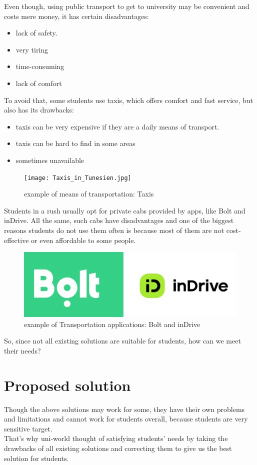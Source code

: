 Even though, using public transport to get to university may be convenient and costs mere money, it has certain disadvantages:
\begin{itemize}
    \item lack of safety.
    \item very tiring
    \item time-consuming
    \item lack of comfort
\end{itemize}
To avoid that, some students use taxis, which offers comfort and fast service, but also has its drawbacks: 
\begin{itemize}
    \item taxis can be very expensive if they are a daily means of transport.
    \item taxis can be hard to find in some areas
    \item sometimes unavailable
\end{itemize}
\begin{figure}[H] 
            \centering
            \texttt{[image: Taxis\_in\_Tunesien.jpg]}
            \caption{example of means of transportation: Taxis} 
            \label{fig: example of means of transportation 2}
\end{figure}
Students in a rush usually opt for private cabs provided by apps, like Bolt and inDrive. All the same, such cabs have disadvantages and one of the biggest reasons students do not use them often is because most of them are not cost-effective or even affordable to some people.
\begin{figure}[H] 
            \centering
            \includegraphics[scale=0.5]{apps_logo.png}
            \caption{example of Transportation applications: Bolt and inDrive} 
            \label{fig: example of Transportation apps}
\end{figure}

So, since not all existing solutions are suitable for students, how can we meet their needs?

\section{Proposed solution}
Though the above solutions may work for some, they have their own problems and limitations and cannot work for students overall, because students are very sensitive target. \\
That’s why uni-world thought of satisfying students’ needs by taking the drawbacks of all existing solutions and correcting them to give us the best solution for students. \\

